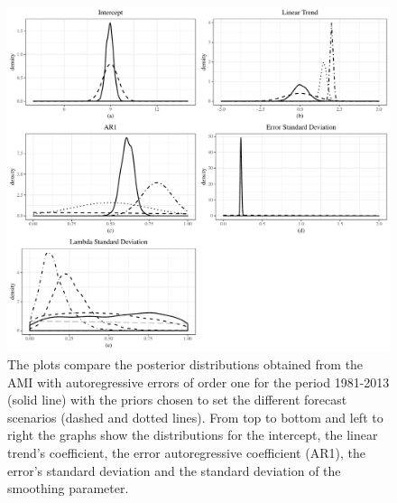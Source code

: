 \documentclass{article}\usepackage[]{graphicx}\usepackage[]{color}
\begin{document}
\begin{figure}[H]
\centering
\includegraphics[scale=0.6]{posterior.pdf}
\caption{The plots compare the posterior distributions obtained from the AMI with autoregressive errors of order one for the period 1981-2013 (solid line) with the priors chosen to set the different forecast scenarios (dashed and dotted lines). From top to bottom and left to right the graphs show the distributions for the intercept, the linear trend's coefficient, the error autoregressive coefficient (AR1), the error's standard deviation and the standard deviation of the smoothing parameter.}
\label{fig:posteriors vs priors}
\end{figure}

\begin{table}[ht] \centering 
\caption{Prior Distributions for the Scenario Analysis} 
\label{prior distribution 1} 
\end{table}
\end{document}
